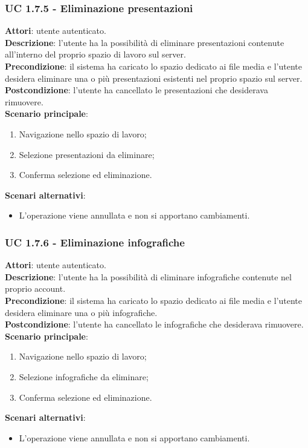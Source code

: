 	\subsubsection{UC 1.7.5 - Eliminazione presentazioni}{
		\label{uc1.7.5}
		\textbf{Attori}: utente autenticato.	\\
		\textbf{Descrizione}: l'utente ha la possibilità di eliminare presentazioni contenute all'interno del proprio spazio di lavoro sul server. \\
		\textbf{Precondizione}: il sistema ha caricato lo spazio dedicato ai file media e l'utente desidera eliminare una o più presentazioni esistenti nel proprio spazio sul server.	\\
		\textbf{Postcondizione}: l'utente ha cancellato le presentazioni che desiderava rimuovere.	\\
		\textbf{Scenario principale}:
		\begin{enumerate}
			\item Navigazione nello spazio di lavoro;
			\item Selezione presentazioni da eliminare;
			\item Conferma selezione ed eliminazione.
		\end{enumerate}
		\textbf{Scenari alternativi}: 
		\begin{itemize}
			\item L'operazione viene annullata e non si apportano cambiamenti.
		\end{itemize}
		}
	\subsubsection{UC 1.7.6 - Eliminazione infografiche}{
		\label{uc1.7.6}
		\textbf{Attori}: utente autenticato.	\\
		\textbf{Descrizione}: l'utente ha la possibilità di eliminare infografiche contenute nel proprio account. \\
		\textbf{Precondizione}: il sistema ha caricato lo spazio dedicato ai file media e l'utente desidera eliminare una o più infografiche.	\\
		\textbf{Postcondizione}: l'utente ha cancellato le infografiche che desiderava rimuovere.	\\
		\textbf{Scenario principale}:
		\begin{enumerate}
			\item Navigazione nello spazio di lavoro;
			\item Selezione infografiche da eliminare;
			\item Conferma selezione ed eliminazione.
		\end{enumerate}
		\textbf{Scenari alternativi}: 
		\begin{itemize}
			\item L'operazione viene annullata e non si apportano cambiamenti.
		\end{itemize}
		}
